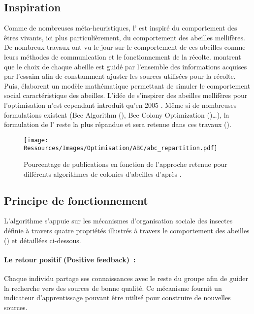 \subsection{Inspiration} %
\label{sub:inspiration}
Comme de nombreuses méta-heuristiques, l’ est inspiré du comportement des êtres
vivants, ici plus particulièrement, du comportement des abeilles mellifères. De
nombreux travaux ont vu le jour sur le comportement de ces abeilles comme leurs méthodes
de communication et le fonctionnement de la récolte. \textcite{Visscher19821790} montrent
que le choix de chaque abeille est guidé par l’ensemble des informations acquises
par l’essaim afin de constamment ajuster les sources utilisées pour la récolte.
Puis, \textcite{Camazine1991547} élaborent un modèle mathématique permettant de simuler
le comportement social caractéristique des abeilles.
L’idée de s’inspirer des abeilles mellifères pour l’optimisation n’est cependant introduit
qu’en 2005 \parencite{Karaboga2005}. Même si de nombreuses formulations existent (Bee
Algorithm (), Bee Colony Optimization ()\dots), la formulation de
l’ reste la plus répandue et sera retenue dans ces travaux ().

\begin{figure}
    \centering
    \texttt{[image: Ressources/Images/Optimisation/ABC/abc\_repartition.pdf]}
    \caption{Pourcentage de publications en fonction de l’approche retenue pour différents
             algorithmes de colonies d’abeilles d’après \cite{Karaboga201221}.}
    \label{fig:abc_repartition}
\end{figure}


\subsection{Principe de fonctionnement} %
\label{sub:principe_de_fonctionnement}
L’algorithme s’appuie sur les mécanismes d’organisation sociale des insectes
\parencite{Bonabeau1999} définie à travers quatre propriétés illustrés à travers le
comportement des abeilles () et détaillées ci-dessous.

\paragraph{Le retour positif (Positive feedback)~:} %
\label{par:positive_feedback}
Chaque individu partage ses connaissances avec le reste du groupe afin de guider
la recherche vers des sources de bonne qualité. Ce mécanisme fournit un indicateur
d’apprentissage pouvant être utilisé pour construire de nouvelles sources.

